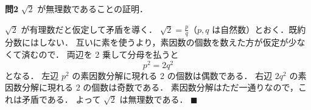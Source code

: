 \textbf{問2} $\sqrt{2}$ が無理数であることの証明．

$\sqrt{2}$ が有理数だと仮定して矛盾を導く．
$\sqrt{2} = \frac{p}{q}$（$p, q$ は自然数）とおく．既約分数にはしない．
互いに素を使うより，素因数の個数を数えた方が仮定が少なくて済むので．
両辺を 2 乗して分母を払うと
\[
  p^2 = 2q^2
\]
となる．
左辺 $p^2$ の素因数分解に現れる 2 の個数は偶数である．
右辺 $2q^2$ の素因数分解に現れる 2 の個数は奇数である．
素因数分解はただ一通りなので，これは矛盾である．
よって $\sqrt{2}$ は無理数である． $\blacksquare$
